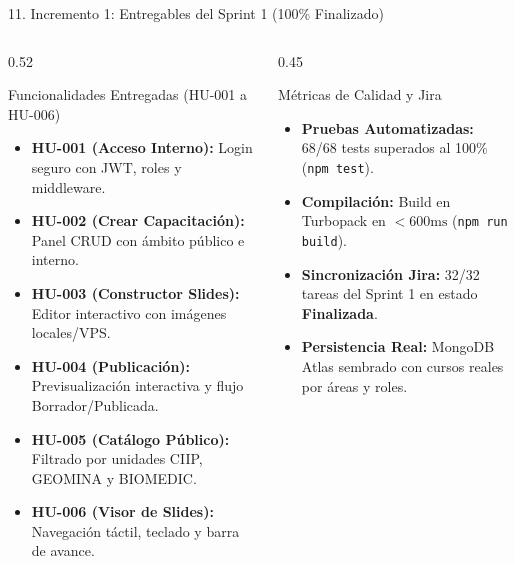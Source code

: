 \documentclass[aspectratio=169, 10pt, spanish]{beamer}
\begin{document}
\begin{frame}{11. Incremento 1: Entregables del Sprint 1 (100\% Finalizado)}
\begin{columns}[T]
    \begin{column}{0.52\textwidth}
        \begin{academicbox}{Funcionalidades Entregadas (HU-001 a HU-006)}
            \tiny
            \begin{itemize}
                \item \textbf{HU-001 (Acceso Interno):} Login seguro con JWT, roles y middleware.
                \item \textbf{HU-002 (Crear Capacitación):} Panel CRUD con ámbito público e interno.
                \item \textbf{HU-003 (Constructor Slides):} Editor interactivo con imágenes locales/VPS.
                \item \textbf{HU-004 (Publicación):} Previsualización interactiva y flujo Borrador/Publicada.
                \item \textbf{HU-005 (Catálogo Público):} Filtrado por unidades CIIP, GEOMINA y BIOMEDIC.
                \item \textbf{HU-006 (Visor de Slides):} Navegación táctil, teclado y barra de avance.
            \end{itemize}
        \end{academicbox}
    \end{column}
    \begin{column}{0.45\textwidth}
        \begin{formalbox}{Métricas de Calidad y Jira}
            \scriptsize
            \begin{itemize}
                \item \textbf{Pruebas Automatizadas:} 68/68 tests superados al 100\% (\texttt{npm test}).
                \item \textbf{Compilación:} Build en Turbopack en $< 600\text{ms}$ (\texttt{npm run build}).
                \item \textbf{Sincronización Jira:} 32/32 tareas del Sprint 1 en estado \textbf{Finalizada}.
                \item \textbf{Persistencia Real:} MongoDB Atlas sembrado con cursos reales por áreas y roles.
            \end{itemize}
        \end{formalbox}
    \end{column}
\end{columns}
\end{frame}
\end{document}
